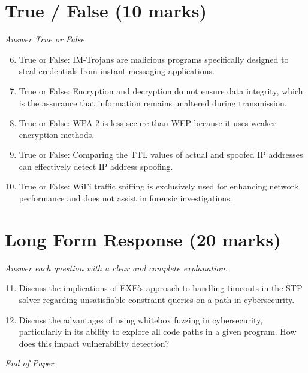 \documentclass[12pt]{article}
\begin{document}
\section*{True / False (10 marks)}
\textit{Answer True or False}
\begin{enumerate}[label=\arabic*.]
\setcounter{enumi}{5}
\item True or False: IM-Trojans are malicious programs specifically designed to steal credentials from instant messaging applications.
\item True or False: Encryption and decryption do not ensure data integrity, which is the assurance that information remains unaltered during transmission.
\item True or False: WPA 2 is less secure than WEP because it uses weaker encryption methods.
\item True or False: Comparing the TTL values of actual and spoofed IP addresses can effectively detect IP address spoofing.
\item True or False: WiFi traffic sniffing is exclusively used for enhancing network performance and does not assist in forensic investigations.
\end{enumerate}

\section*{Long Form Response (20 marks)}
\textit{Answer each question with a clear and complete explanation.}
\begin{enumerate}[label=\arabic*.]
\setcounter{enumi}{10}
\item Discuss the implications of EXE's approach to handling timeouts in the STP solver regarding unsatisfiable constraint queries on a path in cybersecurity.
\item Discuss the advantages of using whitebox fuzzing in cybersecurity, particularly in its ability to explore all code paths in a given program. How does this impact vulnerability detection?
\end{enumerate}

\vfill
\noindent\textit{End of Paper}
\end{document}
